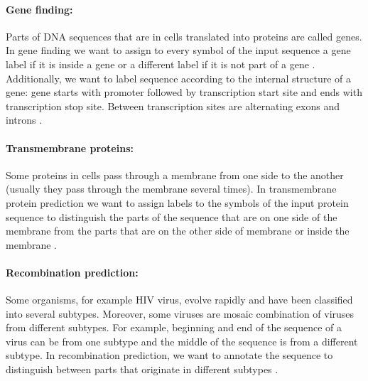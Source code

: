 \paragraph{Gene finding:} Parts of DNA sequences that are in cells translated
into proteins are called genes.  In gene finding we want to assign to every
symbol of the input sequence a gene label if it is inside a gene or a different
label if it is not part of a gene \cite{GeneWise2004, Brejova2005, Burge1997,
Alexanderson2004}. Additionally, we want to label sequence according to the
internal structure of a gene: gene starts with promoter followed by
transcription start site and ends with transcription stop site. Between
transcription sites are alternating exons and introns \cite{TODO}. 


\paragraph{Transmembrane proteins:} Some proteins in cells pass through a membrane
from one side to the another (usually they pass through the membrane several times).  In
transmembrane protein prediction we want to assign labels to the symbols of the input
protein sequence to distinguish the parts of the sequence that are on one side of the
membrane from the parts that are on the other side of membrane or inside the membrane
\cite{Brown2010}.

\paragraph{Recombination prediction:} Some organisms, for example HIV virus,
evolve rapidly and have been classified into several subtypes.  Moreover,
some viruses are mosaic combination of viruses from different subtypes. For
example, beginning and end of the sequence of a virus can be from one subtype and
the middle of the sequence is from a different subtype. In recombination prediction,
we want to annotate the sequence to distinguish between parts that originate in
different subtypes \cite{Nanasi2010,Truszkowski2011}.  

